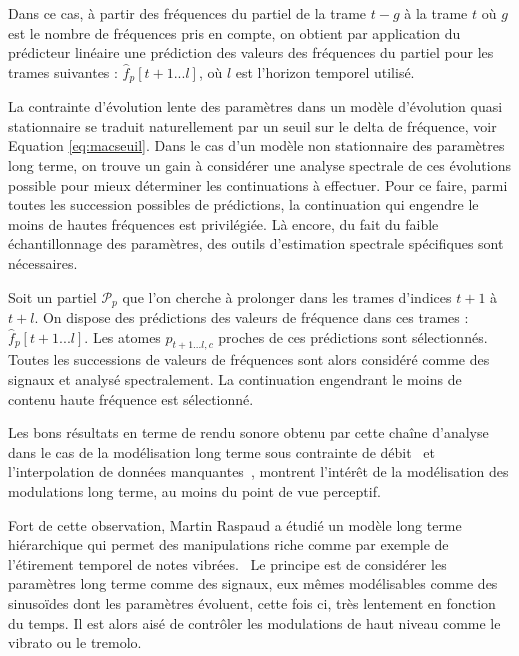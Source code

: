 Dans ce cas, à partir des fréquences du partiel de la trame $t-g$ à la trame $t$ où $g$ est le nombre de fréquences pris en compte, on obtient par application du prédicteur linéaire une prédiction des valeurs des fréquences du partiel pour les trames suivantes : $\hat{f}_{p}[t+1...l]$, où $l$ est l'horizon temporel utilisé.

La contrainte d'évolution lente des paramètres dans un modèle d'évolution quasi stationnaire se traduit naturellement par un seuil sur le delta de fréquence, voir Equation \ref{eq:macseuil}. Dans le cas d'un modèle non stationnaire des paramètres long terme, on trouve un gain à considérer une analyse spectrale de ces évolutions possible pour mieux déterminer les continuations à effectuer. Pour ce faire, parmi toutes les succession possibles de prédictions, la continuation qui engendre le moins de hautes fréquences est privilégiée. Là encore, du fait du faible échantillonnage des paramètres, des outils d'estimation spectrale spécifiques sont nécessaires.


Soit un partiel $\mathcal{P}_{p}$ que l'on cherche à prolonger dans les trames d'indices $t+1$ à $t+l$. On dispose des prédictions des valeurs de fréquence dans ces trames : $\hat{f}_{p}[t+1...l]$. Les atomes $p_{t+1...l, c}$ proches de ces prédictions sont sélectionnés. Toutes les successions de valeurs de fréquences sont alors considéré comme des signaux et analysé spectralement. La continuation engendrant le moins de contenu haute fréquence est sélectionné.


Les bons résultats en terme de rendu sonore obtenu par cette chaîne d'analyse dans le cas  de la modélisation long terme sous contrainte de débit~\cite{lagrangeTaslp06} et l'interpolation de données manquantes~\cite{lagrangeJaes05}, montrent l'intérêt de la modélisation des modulations long terme, au moins du point de vue perceptif.

Fort de cette observation, Martin Raspaud a étudié un modèle long terme hiérarchique qui permet des manipulations riche comme par exemple de l'étirement temporel de notes vibrées.~\cite{raspaud2007modeles} Le principe est de considérer les paramètres long terme comme des signaux, eux mêmes modélisables comme des sinusoïdes dont les paramètres évoluent, cette fois ci, très lentement en fonction du temps. Il est alors aisé de contrôler les modulations de haut niveau comme le vibrato ou le tremolo.




